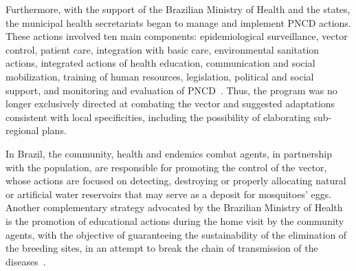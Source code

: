Furthermore, with the support of the Brazilian Ministry of Health and the states, the municipal health secretariats began to manage and implement PNCD actions.
These actions involved ten main components: epidemiological surveillance, vector control, patient care, integration with basic care, environmental sanitation actions, integrated actions of health education, communication and social mobilization, training of human resources, legislation, political and social support, and monitoring and evaluation of PNCD~\cite{web:pncdbrasil}.
Thus, the program was no longer exclusively directed at combating the vector and suggested adaptations consistent with local specificities, including the possibility of elaborating sub-regional plans.

In Brazil, the community, health and endemics combat agents, in partnership with the population, are responsible for promoting the control of the vector, whose actions are focused on detecting, destroying or properly allocating natural or artificial water reservoirs that may serve as a deposit for mosquitoes' eggs.
Another complementary strategy advocated by the Brazilian Ministry of Health is the promotion of educational actions during the home visit by the community agents, with the objective of guaranteeing the sustainability of the elimination of the breeding sites, in an attempt to break the chain of transmission of the diseases~\cite{brasil2009diretrizes}.


